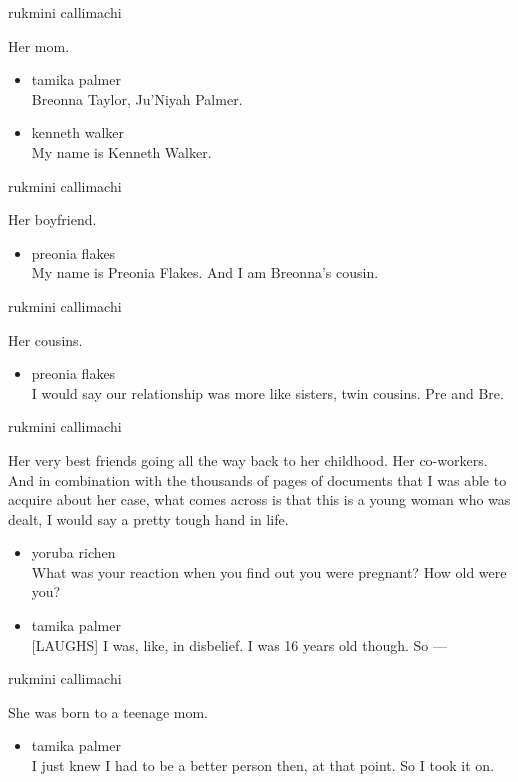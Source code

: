 rukmini callimachi

Her mom.

\begin{itemize}
\item
  tamika palmer\\
  Breonna Taylor, Ju'Niyah Palmer.
\item
  kenneth walker\\
  My name is Kenneth Walker.
\end{itemize}

rukmini callimachi

Her boyfriend.

\begin{itemize}
\tightlist
\item
  preonia flakes\\
  My name is Preonia Flakes. And I am Breonna's cousin.
\end{itemize}

rukmini callimachi

Her cousins.

\begin{itemize}
\tightlist
\item
  preonia flakes\\
  I would say our relationship was more like sisters, twin cousins. Pre
  and Bre.
\end{itemize}

rukmini callimachi

Her very best friends going all the way back to her childhood. Her
co-workers. And in combination with the thousands of pages of documents
that I was able to acquire about her case, what comes across is that
this is a young woman who was dealt, I would say a pretty tough hand in
life.

\begin{itemize}
\item
  yoruba richen\\
  What was your reaction when you find out you were pregnant? How old
  were you?
\item
  tamika palmer\\
  {[}LAUGHS{]} I was, like, in disbelief. I was 16 years old though. So
  ---
\end{itemize}

rukmini callimachi

She was born to a teenage mom.

\begin{itemize}
\tightlist
\item
  tamika palmer\\
  I just knew I had to be a better person then, at that point. So I took
  it on.
\end{itemize}

